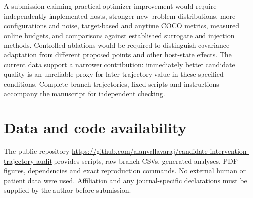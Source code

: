 \documentclass[11pt,a4paper]{article}
\begin{document}
A submission claiming practical optimizer improvement would require independently implemented hosts, stronger new problem distributions, more configurations and noise, target-based and anytime COCO metrics, measured online budgets, and comparisons against established surrogate and injection methods. Controlled ablations would be required to distinguish covariance adaptation from different proposed points and other host-state effects. The current data support a narrower contribution: immediately better candidate quality is an unreliable proxy for later trajectory value in these specified conditions. Complete branch trajectories, fixed scripts and instructions accompany the manuscript for independent checking.

\section*{Data and code availability}
The public repository \url{https://github.com/alanvallavaraj/candidate-intervention-trajectory-audit} provides scripts, raw branch CSVs, generated analyses, PDF figures, dependencies and exact reproduction commands. No external human or patient data were used. Affiliation and any journal-specific declarations must be supplied by the author before submission.



\end{document}
